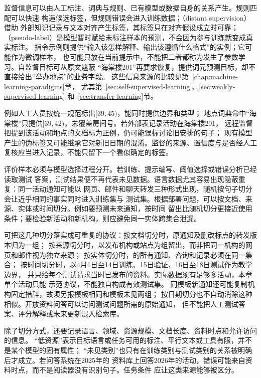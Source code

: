 监督信息可以由人工标注、词典与规则、已有模型或数据自身的关系产生。规则匹配可以快速
构造候选标签，但规则错误会进入训练数据；（distant supervision）借助
外部知识记录与文本对齐产生标签，其标签只在对齐假设成立时可靠；
（pseudo-label）是模型暂时赋给未标注样本的预测，不会因为参与训练就变成真实标注。
指令示例则提供“输入该怎样解释、输出该遵循什么格式”的实例；它可能作为微调样本，
也可能只放在当前提示中，不能把二者都称为发生了参数学习。自监督目标可从原文遮蔽
“海棠楼201”再要求恢复，提供词元预测目标，却不直接给出“举办地点”的业务字段。
这些信息来源的比较见第~\ref{chap:machine-learning-paradigms}章，
尤其第~\ref{sec:self-supervised-learning}、\ref{sec:weakly-supervised-learning}
和~\ref{sec:transfer-learning}节。

例如人工人员按统一规范标出$[39,45)$，能同时提供边界和类型；
地点词典命中“海棠楼”只提供$[39,42)$，未覆盖房间号。若外部表记录活动在海棠楼201，
远程监督把提到该活动和地点的文档标为正例，仍可能误标讨论旧安排的句子；
现有模型产生的伪标签又可能继承它对新旧日期的混淆。监督的来源、置信度与是否经人工
复核应当进入记录，不能只留下一个看似确定的标签。

评价样本必须与模型选择过程分开。若训练、提示编写、阈值选择或错误分析已经读取测试
答案，测试结果便不再代表未见数据。语言数据尤其容易出现隐蔽重复：同一活动通知可能以
网页、邮件和聊天转发三种形式出现，随机按句子切分会让近乎相同的事实同时进入训练集与
测试集。根据部署问题，可以按文档、来源、实体或时间切分。例如要预测未来通知，按时间
留出比随机切分更接近使用条件；要检验新活动和新机构，则应避免同一实体跨集合泄漏。

可把这几种切分落实成可重复的协议：按文档切分时，原通知及删改标点的转发版本归为一组；
按来源切分时，以发布机构或站点为组留出，而非把同一机构的网页和邮件视为独立来源；
按实体切分时，的所有通知、咨询和记录必须在同一集合；
按时间切分时，以4月1日至14日训练、15日验证、16日至18日测试作为教学边界，
并只给每个测试请求当时已发布的资料。实际数据须有足够多活动，本章单个活动只能
示范协议，不能独自构成有效测试集。
同模板新通知还可能复制机构固定措辞，故须另报模板相同和模板未见两组；
按日期切分也不自动消除这种相似。开放资料问答可以访问测试问题所需的原始通知，
但不能把人工测试答案、评分解释或未来更新混入检索库。

除了切分方式，还要记录语言、领域、资源规模、文档长度、资料时点和允许访问的信息。
“低资源”表示目标语言或任务可用的标注、平行文本或工具有限，并不是某个模型的固有属性；
“未见类别”也只有在训练类别与测试类别的关系被明确后才成立。若问答系统在2025年的
资料库上回答2026年的活动，错误可能来自资料时点，而不是阅读器没有识别句子。任务条件
应让这类来源能够被区分。

